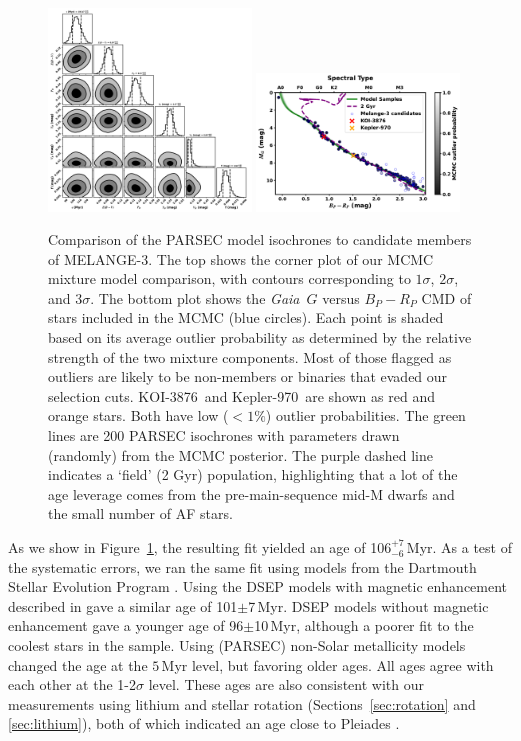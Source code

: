 \documentclass[twocolumn, linenumbers]{aastex631}
\newcommand{\association}{MELANGE-3}
\newcommand{\starname}{KOI-3876}
\newcommand{\starnametwo}{Kepler-970}
\newcommand{\gaia}{\textit{Gaia}}
\begin{document}
\begin{figure}[tbhp]
    \centering
    \includegraphics[width=0.48\textwidth]{CornerMixture.pdf}
    \includegraphics[width=0.48\textwidth]{CMDMixture.pdf}
    \caption{Comparison of the PARSEC model isochrones to candidate members of \association. The top shows the corner plot of our MCMC mixture model comparison, with contours corresponding to $1\sigma$, $2\sigma$, and $3\sigma$. The bottom plot shows the \gaia\ $G$ versus $B_P-R_P$ CMD of stars included in the MCMC (blue circles). Each point is shaded based on its average outlier probability as determined by the relative strength of the two mixture components. Most of those flagged as outliers are likely to be non-members or binaries that evaded our selection cuts. \starname\ and \starnametwo\ are shown as red and orange stars. Both have low ($<1\%$) outlier probabilities. The green lines are 200 PARSEC isochrones with parameters drawn (randomly) from the MCMC posterior. The purple dashed line indicates a `field' (2 Gyr) population, highlighting that a lot of the age leverage comes from the pre-main-sequence mid-M dwarfs and the small number of AF stars. }
    \label{fig:isochrone}
\end{figure} 

As we show in Figure~\ref{fig:isochrone}, the resulting fit yielded an age of 106$^{+7}_{-6}$\,Myr. As a test of the systematic errors, we ran the same fit using models from the Dartmouth Stellar Evolution Program \citep[DSEP,][]{Dotter2008}. Using the DSEP models with magnetic enhancement described in \citet{Feiden2012b} gave a similar age of 101$\pm$7\,Myr. DSEP models without magnetic enhancement gave a younger age of 96$\pm$10\,Myr, although a poorer fit to the coolest stars in the sample. Using (PARSEC) non-Solar metallicity models changed the age at the $5$\,Myr level, but favoring older ages. All ages agree with each other at the 1-2$\sigma$ level. These ages are also consistent with our measurements using lithium and stellar rotation (Sections~\ref{sec:rotation} and \ref{sec:lithium}), both of which indicated an age close to Pleiades \citep[$\simeq$112\,Myr; ][]{Dahm2015}. 
\end{document}
